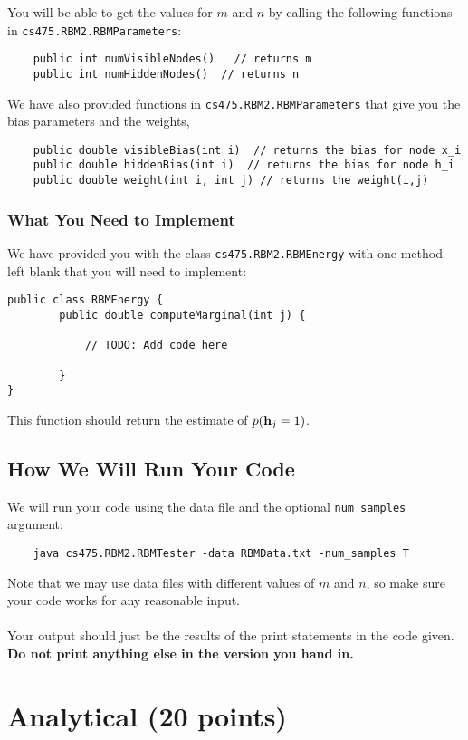 \documentclass[11pt]{article}
\newcommand{\vh}{{\bf h}}
\newcommand{\code}[1]{{\footnotesize \tt #1}}
\begin{document}
You will be able to get the values for $m$ and $n$ by calling the following functions in \code{cs475.RBM2.RBMParameters}:
\begin{verbatim}
    public int numVisibleNodes()   // returns m
    public int numHiddenNodes()  // returns n
\end{verbatim}
We have also provided functions in \code{cs475.RBM2.RBMParameters} that give you the bias parameters and the weights,
\begin{verbatim}
    public double visibleBias(int i)  // returns the bias for node x_i
    public double hiddenBias(int i)  // returns the bias for node h_i
    public double weight(int i, int j) // returns the weight(i,j)
\end{verbatim}

\subsubsection{What You Need to Implement} %
We have provided you with the class \code{cs475.RBM2.RBMEnergy} with one method left blank that you will need to implement:
\begin{verbatim}
public class RBMEnergy {
    	public double computeMarginal(int j) {
    		
    		// TODO: Add code here
    		
    	}
}

\end{verbatim}
This function should return the estimate of $p(\vh_j = 1)$.
\subsection{How We Will Run Your Code} %
We will run your code using the data file and the optional \code{num\_samples} argument:
\begin{verbatim}
    java cs475.RBM2.RBMTester -data RBMData.txt -num_samples T
\end{verbatim}
Note that we may use data files with different values of $m$ and $n$, so make sure your code works for any reasonable input.\\
\\
Your output should just be the results of the print statements in the code given. {\bf Do not print anything else in the version you hand in.}


\section{Analytical (20 points)}
\end{document}
